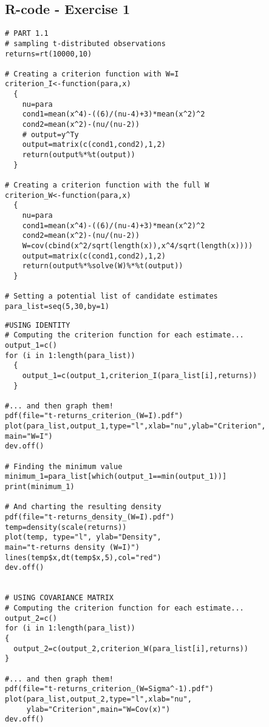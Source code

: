 \begin{appendices}

\chapter{R-code - Exercise 1}

\begin{verbatim}
# PART 1.1
# sampling t-distributed observations
returns=rt(10000,10)

# Creating a criterion function with W=I
criterion_I<-function(para,x)
  {
    nu=para
    cond1=mean(x^4)-((6)/(nu-4)+3)*mean(x^2)^2
    cond2=mean(x^2)-(nu/(nu-2))
    # output=y^Ty
    output=matrix(c(cond1,cond2),1,2)
    return(output%*%t(output))
  }

# Creating a criterion function with the full W
criterion_W<-function(para,x)
  {
    nu=para
    cond1=mean(x^4)-((6)/(nu-4)+3)*mean(x^2)^2
    cond2=mean(x^2)-(nu/(nu-2))
    W=cov(cbind(x^2/sqrt(length(x)),x^4/sqrt(length(x))))
    output=matrix(c(cond1,cond2),1,2)
    return(output%*%solve(W)%*%t(output))
  }

# Setting a potential list of candidate estimates
para_list=seq(5,30,by=1)

\end{verbatim}
\newpage
\begin{verbatim}
#USING IDENTITY
# Computing the criterion function for each estimate...
output_1=c()
for (i in 1:length(para_list))
  {
    output_1=c(output_1,criterion_I(para_list[i],returns))
  }

#... and then graph them!
pdf(file="t-returns_criterion_(W=I).pdf")
plot(para_list,output_1,type="l",xlab="nu",ylab="Criterion",
main="W=I")
dev.off()

# Finding the minimum value
minimum_1=para_list[which(output_1==min(output_1))]
print(minimum_1)

# And charting the resulting density
pdf(file="t-returns_density_(W=I).pdf")
temp=density(scale(returns))
plot(temp, type="l", ylab="Density", 
main="t-returns density (W=I)")
lines(temp$x,dt(temp$x,5),col="red")
dev.off()


# USING COVARIANCE MATRIX
# Computing the criterion function for each estimate...
output_2=c()
for (i in 1:length(para_list))
{
  output_2=c(output_2,criterion_W(para_list[i],returns))
}

#... and then graph them!
pdf(file="t-returns_criterion_(W=Sigma^-1).pdf")
plot(para_list,output_2,type="l",xlab="nu",
     ylab="Criterion",main="W=Cov(x)")
dev.off()


\end{verbatim}
\end{appendices}
